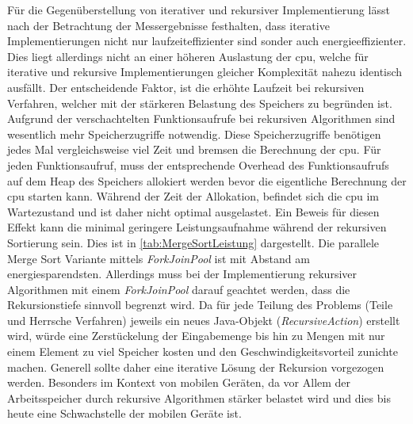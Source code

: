 Für die Gegenüberstellung von iterativer und rekursiver Implementierung lässt nach der Betrachtung der Messergebnisse festhalten, dass iterative Implementierungen nicht nur laufzeiteffizienter sind sonder auch energieeffizienter. Dies liegt allerdings nicht an einer höheren Auslastung der \ac{cpu}, welche für iterative und rekursive Implementierungen gleicher Komplexität nahezu identisch ausfällt. Der entscheidende Faktor, ist die erhöhte Laufzeit bei rekursiven Verfahren, welcher mit der stärkeren Belastung des Speichers zu begründen ist. Aufgrund der verschachtelten Funktionsaufrufe bei rekursiven Algorithmen sind wesentlich mehr Speicherzugriffe notwendig. Diese Speicherzugriffe benötigen jedes Mal vergleichsweise viel Zeit und bremsen die Berechnung der \ac{cpu}. Für jeden Funktionsaufruf, muss der entsprechende Overhead des Funktionsaufrufs auf dem Heap des Speichers allokiert werden bevor die eigentliche Berechnung der \ac{cpu} starten kann. Während der Zeit der Allokation, befindet sich die \ac{cpu} im Wartezustand und ist daher nicht optimal ausgelastet. Ein Beweis für diesen Effekt kann die minimal geringere Leistungsaufnahme während der rekursiven Sortierung sein. Dies ist in \autoref{tab:MergeSortLeistung} dargestellt. Die parallele Merge Sort Variante mittels \emph{ForkJoinPool} ist mit Abstand am energiesparendsten. Allerdings muss bei der Implementierung rekursiver Algorithmen mit einem \emph{ForkJoinPool} darauf geachtet werden, dass die Rekursionstiefe sinnvoll begrenzt wird. Da für jede Teilung des Problems (Teile und Herrsche Verfahren) jeweils ein neues Java-Objekt (\emph{RecursiveAction}) erstellt wird, würde eine Zerstückelung der Eingabemenge bis hin zu Mengen mit nur einem Element zu viel Speicher kosten und den Geschwindigkeitsvorteil zunichte machen. Generell sollte daher eine iterative Lösung der Rekursion vorgezogen werden. Besonders im Kontext von mobilen Geräten, da vor Allem der Arbeitsspeicher durch rekursive Algorithmen stärker belastet wird und dies bis heute eine Schwachstelle der mobilen Geräte ist.